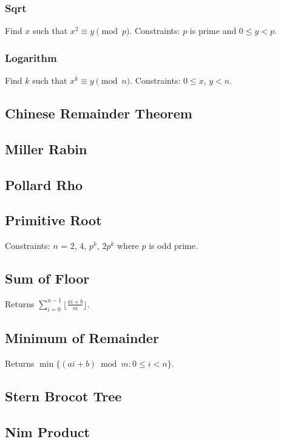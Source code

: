 \documentclass{article}
\begin{document}
\begin{multicols}{2}
    \subsubsection{Sqrt}
    Find $x$ such that $x^2\equiv y\pmod p$.
    \newline Constraints: $p$ is prime and $0\le y<p$.
    
    \subsubsection{Logarithm}
    Find $k$ such that $x^k\equiv y\pmod n$.
    \newline Constraints: $0\le x$, $y<n$.
    
    \subsection{Chinese Remainder Theorem}
    
    \subsection{Miller Rabin}
    
    \subsection{Pollard Rho}
    
    \subsection{Primitive Root}
    Constraints: $n$ = $2$, $4$, $p^k$, $2p^{k}$ where $p$ is odd prime.
    
    \subsection{Sum of Floor}
    Returns $\sum_{i=0}^{n-1}\lfloor\frac{ai+b}{m}\rfloor$.
    
    \subsection{Minimum of Remainder}
    Returns $\min\{(ai+b)\bmod m:0\le i<n\}$.
    
    \subsection{Stern Brocot Tree}
    
    \subsection{Nim Product}
    


\end{multicols}
\end{document}
